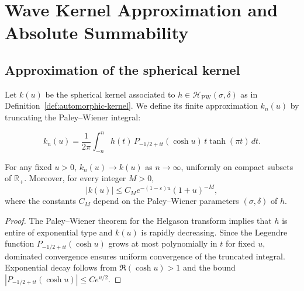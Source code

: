 
\section{Wave Kernel Approximation and Absolute Summability}
\label{sec:ch4-part2-wavekernel} \relax \hspace{0pt}

\subsection{Approximation of the spherical kernel}
\label{subsec:ch4-part2-spherical} \relax

Let $k(u)$ be the spherical kernel associated to $h\in\mathcal{H}_{\mathrm{PW}}(\sigma,\delta)$ as in Definition~\ref{def:automorphic-kernel}.  
We define its finite approximation $k_n(u)$ by truncating the Paley–Wiener integral:

\[
k_n(u) = \frac{1}{2\pi} \int_{-n}^{n} h(t)\, P_{-1/2+it}(\cosh u)\, t\tanh(\pi t)\,dt.
\]

\begin{lemma}
\label{lem:wave-approx}
For any fixed $u>0$, $k_n(u)\to k(u)$ as $n\to\infty$, uniformly on compact subsets of $\mathbb{R}_+$.  
Moreover, for every integer $M>0$,
\[
|k(u)| \le C_M e^{-(1-\varepsilon)u}(1+u)^{-M},
\]
where the constants $C_M$ depend on the Paley–Wiener parameters $(\sigma,\delta)$ of $h$.
\end{lemma}

\begin{proof}\relax
The Paley–Wiener theorem for the Helgason transform implies that $h$ is entire of exponential type and $k(u)$ is rapidly decreasing.  
Since the Legendre function $P_{-1/2+it}(\cosh u)$ grows at most polynomially in $t$ for fixed $u$, dominated convergence ensures uniform convergence of the truncated integral.  
Exponential decay follows from $\Re(\cosh u) > 1$ and the bound $|P_{-1/2+it}(\cosh u)|\le Ce^{u/2}$.
\end{proof}

